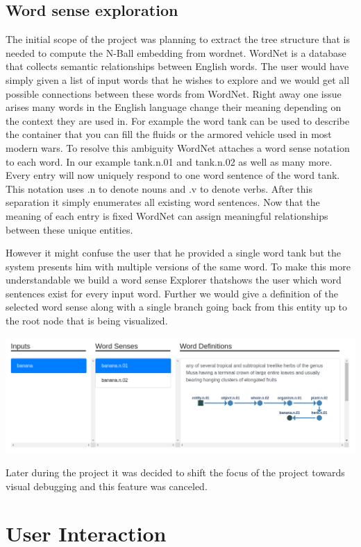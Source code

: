 \documentclass[]{article}
\begin{document}
\subsection{Word sense exploration}
The initial scope of the project was planning to extract the tree structure that is needed to compute the N-Ball embedding from wordnet. WordNet is a database that collects semantic relationships between English words. The user would have simply given a list of input words that he wishes to explore and we would get all possible connections between these words from WordNet. 
Right away one issue arises many words in the English language change their meaning depending on the context they are used in. For example the word tank can be used to describe the container that you can fill the fluids or the armored vehicle used in most modern wars. To resolve this ambiguity WordNet attaches a word sense notation to each word. In our example tank.n.01 and tank.n.02 as well as many more. Every entry will now uniquely respond to one word sentence of the word tank. This notation uses .n to denote nouns and .v to denote verbs. After this separation it simply enumerates all existing word sentences. Now that the meaning of each entry is fixed WordNet can assign meaningful relationships between these unique entities. 

However it might confuse the user that he provided a single word tank but the system presents him with multiple versions of the same word. To make this more understandable we build a word sense Explorer thatshows the user which word sentences exist for every input word. Further we would give a definition of the selected word sense along with a single branch going back from this entity up to the root node that is being visualized.

\includegraphics[width=\textwidth]{res/word-sense.png}

Later during the project it was decided to shift the focus of the project towards visual debugging and this feature was canceled.
\section{User Interaction}
\end{document}
